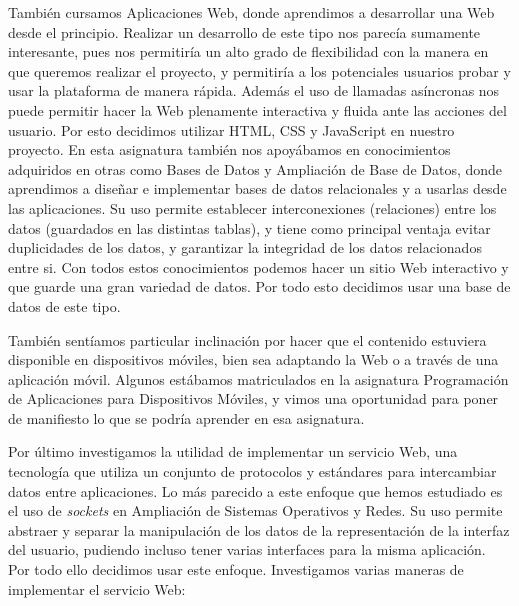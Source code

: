 También cursamos Aplicaciones Web, donde aprendimos a desarrollar una Web desde el principio. Realizar un desarrollo de este tipo nos parecía sumamente interesante, pues nos permitiría un alto grado de flexibilidad con la manera en que queremos realizar el proyecto, y permitiría a los potenciales usuarios probar y usar la plataforma de manera rápida. Además el uso de llamadas asíncronas nos puede permitir hacer la Web plenamente interactiva y fluida ante las acciones del usuario. Por esto decidimos utilizar HTML, CSS y JavaScript en nuestro proyecto. En esta asignatura también nos apoyábamos en conocimientos adquiridos en otras como Bases de Datos y Ampliación de Base de Datos, donde aprendimos a diseñar e implementar bases de datos relacionales y a usarlas desde las aplicaciones. Su uso permite establecer interconexiones (relaciones) entre los datos (guardados en las distintas tablas), y tiene como principal ventaja evitar duplicidades de los datos, y garantizar la integridad de los datos relacionados entre si. Con todos estos conocimientos podemos hacer un sitio Web interactivo y que guarde una gran variedad de datos. Por todo esto decidimos usar una base de datos de este tipo.

También sentíamos particular inclinación por hacer que el contenido estuviera disponible en dispositivos móviles, bien sea adaptando la Web o a través de una aplicación móvil. Algunos estábamos matriculados en la asignatura Programación de Aplicaciones para Dispositivos Móviles, y vimos una oportunidad para poner de manifiesto lo que se podría aprender en esa asignatura.

Por último investigamos la utilidad de implementar un servicio Web, una tecnología que utiliza un conjunto de protocolos y estándares para intercambiar datos entre aplicaciones. Lo más parecido a este enfoque que hemos estudiado es el uso de \emph{sockets} en Ampliación de Sistemas Operativos y Redes. Su uso permite abstraer y separar la manipulación de los datos de la representación de la interfaz del usuario, pudiendo incluso tener varias interfaces para la misma aplicación. Por todo ello decidimos usar este enfoque. Investigamos varias maneras de implementar el servicio Web:

